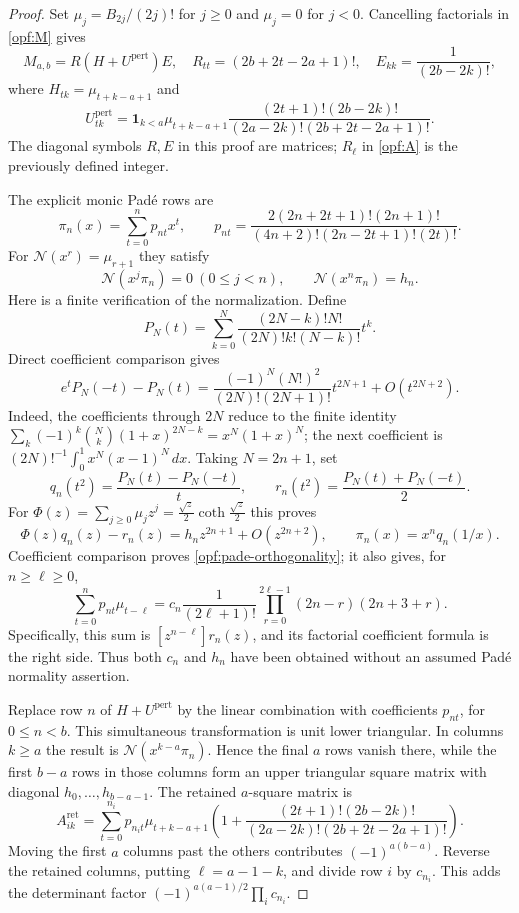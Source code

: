 \begin{proof}
Set $\mu_j=B_{2j}/(2j)!$ for $j\ge0$ and $\mu_j=0$ for $j<0$.
Cancelling factorials in \eqref{opf:M} gives
\[
 M_{a,b}=R(H+U^{\mathrm{pert}})E,
 \quad R_{tt}=(2b+2t-2a+1)!,\quad E_{kk}=\frac1{(2b-2k)!},
\]
where $H_{tk}=\mu_{t+k-a+1}$ and
\[
 U^{\mathrm{pert}}_{tk}=\mathbf1_{k<a}\mu_{t+k-a+1}
 \frac{(2t+1)!(2b-2k)!}
 {(2a-2k)!(2b+2t-2a+1)!}.
\]
The diagonal symbols $R,E$ in this proof are matrices; $R_\ell$
in \eqref{opf:A} is the previously defined integer.

The explicit monic Pad\'e rows are
\[
 \pi_n(x)=\sum_{t=0}^np_{nt}x^t,\qquad
 p_{nt}=\frac{2(2n+2t+1)!(2n+1)!}
 {(4n+2)!(2n-2t+1)!(2t)!}.
\]
For $\mathcal N(x^r)=\mu_{r+1}$ they satisfy
\begin{equation}\label{opf:pade-orthogonality}
 \mathcal N(x^j\pi_n)=0\ (0\le j<n),\qquad
 \mathcal N(x^n\pi_n)=h_n.
\end{equation}
Here is a finite verification of the normalization. Define
\[
 P_N(t)=\sum_{k=0}^N
 \frac{(2N-k)!N!}{(2N)!k!(N-k)!}t^k.
\]
Direct coefficient comparison gives
\[
 e^tP_N(-t)-P_N(t)
 =\frac{(-1)^N(N!)^2}{(2N)!(2N+1)!}t^{2N+1}
       +O(t^{2N+2}).
\]
Indeed, the coefficients through $2N$ reduce to the finite identity
$\sum_k(-1)^k\binom Nk(1+x)^{2N-k}=x^N(1+x)^N$;
the next coefficient is
$(2N)!^{-1}\int_0^1x^N(x-1)^N\,dx$.
Taking $N=2n+1$, set
\[
 q_n(t^2)=\frac{P_N(t)-P_N(-t)}t,\qquad
 r_n(t^2)=\frac{P_N(t)+P_N(-t)}2.
\]
For $\Phi(z)=\sum_{j\ge0}\mu_jz^j
=\frac{\sqrt z}{2}\coth\frac{\sqrt z}{2}$ this proves
\[
 \Phi(z)q_n(z)-r_n(z)=h_nz^{2n+1}+O(z^{2n+2}),
 \qquad \pi_n(x)=x^nq_n(1/x).
\]
Coefficient comparison proves \eqref{opf:pade-orthogonality};
it also gives, for $n\ge\ell\ge0$,
\begin{equation}\label{opf:constant-pade-row}
 \sum_{t=0}^np_{nt}\mu_{t-\ell}=c_n
 \frac1{(2\ell+1)!}
 \prod_{r=0}^{2\ell-1}(2n-r)(2n+3+r).
\end{equation}
Specifically, this sum is $[z^{n-\ell}]r_n(z)$, and its
factorial coefficient formula is the right side. Thus both
$c_n$ and $h_n$ have been obtained without an assumed Pad\'e
normality assertion.

Replace row $n$ of $H+U^{\mathrm{pert}}$ by the linear combination
with coefficients $p_{nt}$, for $0\le n<b$. This simultaneous
transformation is unit lower triangular. In columns $k\ge a$ the
result is $\mathcal N(x^{k-a}\pi_n)$. Hence the final $a$ rows
vanish there, while the first $b-a$ rows in those columns form an
upper triangular square matrix with diagonal
$h_0,\ldots,h_{b-a-1}$. The retained $a$-square matrix is
\[
 A^{\mathrm{ret}}_{ik}=
 \sum_{t=0}^{n_i}p_{n_it}\mu_{t+k-a+1}
 \left(1+\frac{(2t+1)!(2b-2k)!}
 {(2a-2k)!(2b+2t-2a+1)!}\right).
\]
Moving the first $a$ columns past the others contributes
$(-1)^{a(b-a)}$. Reverse the retained columns, putting
$\ell=a-1-k$, and divide row $i$ by $c_{n_i}$.
This adds the determinant factor
$(-1)^{a(a-1)/2}\prod_i c_{n_i}$.


\end{proof}
